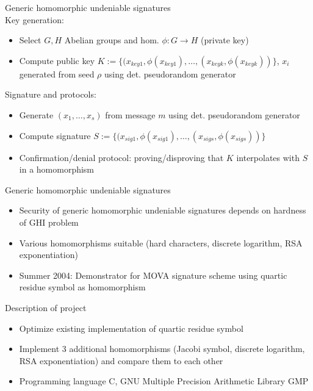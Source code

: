 \documentclass[a4, landscape, slidesonly]{seminar}
\renewcommand{\emph}[1]{{\color{emphcolor} #1}}
\newcommand{\slidetitle}[1]{{\large \color{titlecolor} #1}}
\begin{document}
\begin{slide}
\slidetitle{Generic homomorphic undeniable signatures}
\\[0.5cm]
\emph{Key generation:}
\begin{itemize}
\item Select $G, H$ Abelian groups and hom. $\phi : G \to H$ (private key)
\item Compute public key $K := \{(x_{key1},\phi(x_{key1}),\ldots,(x_{keyk},\phi(x_{keyk}))\}$, $x_i$ generated from seed $\rho$ using det. pseudorandom generator
\end{itemize}
\emph{Signature and protocols:}
\begin{itemize}
\item Generate $(x_1, \ldots, x_s)$ from message $m$ using det. pseudorandom generator
\item Compute signature $S:= \{(x_{sig1},\phi(x_{sig1}),\ldots,(x_{sigs},\phi(x_{sigs}))\}$
\item Confirmation/denial protocol: proving/disproving that $K$ interpolates with $S$ in a homomorphism
 \end{itemize} 
\end{slide}
\begin{slide}
\slidetitle{Generic homomorphic undeniable signatures}
\\[.2cm]
\begin{itemize}
\item Security of generic homomorphic undeniable signatures depends on hardness of GHI problem
\item Various homomorphisms suitable (hard characters, discrete logarithm, RSA exponentiation)
\item Summer 2004: Demonstrator for MOVA signature scheme using quartic residue symbol as homomorphism
\end{itemize}
\end{slide}
\begin{slide}
\slidetitle{Description of project}
\\[.2cm]
\begin{itemize}
\item Optimize existing implementation of quartic residue symbol
\item Implement 3 additional homomorphisms (Jacobi symbol, discrete logarithm, RSA exponentiation) and compare them to each other
\item Programming language C, GNU Multiple Precision Arithmetic Library GMP
\end{itemize}
\end{slide}
\end{document}

